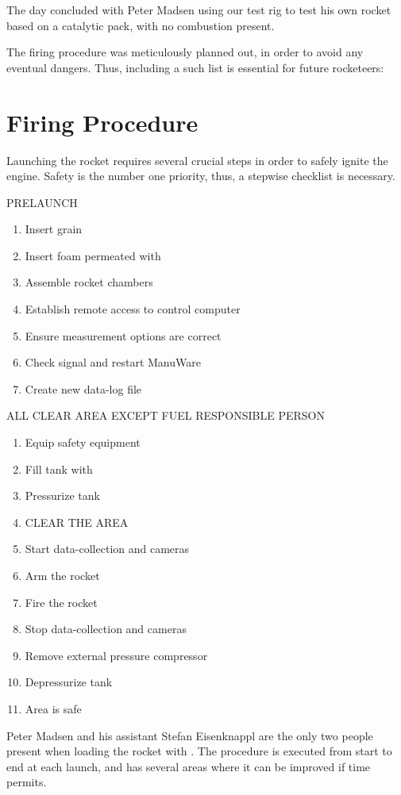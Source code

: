 		The day concluded with Peter Madsen using our test rig to test his own rocket based on a catalytic pack, with no combustion present.

		The firing procedure was meticulously planned out, in order to avoid any eventual dangers. Thus, including a such list is essential for future rocketeers:

\section{Firing Procedure}
	Launching the rocket requires several crucial steps in order to safely ignite the engine. Safety is the number one priority, thus, a stepwise checklist is necessary.

PRELAUNCH
\begin{enumerate}
  \itemsep0em
  \item Insert grain
  \item Insert foam permeated with 
  \item Assemble rocket chambers
  \item Establish remote access to control computer
  \item Ensure measurement options are correct
  \item Check signal and restart ManuWare
  \item Create new data-log file
\end{enumerate}
ALL CLEAR AREA EXCEPT FUEL RESPONSIBLE PERSON
\begin{enumerate}
  \itemsep0em
  \item Equip  safety equipment
  \item Fill tank with 
  \item Pressurize tank
  \item CLEAR THE AREA
  \item Start data-collection and cameras
  \item Arm the rocket
  \item Fire the rocket
  \item Stop data-collection and cameras
  \item Remove external pressure compressor
  \item Depressurize tank
  \item Area is safe
\end{enumerate}

	Peter Madsen and his assistant Stefan Eisenknappl are the only two people present when loading the rocket with . The procedure is executed from start to end at each launch, and has several areas where it can be improved if time permits.

